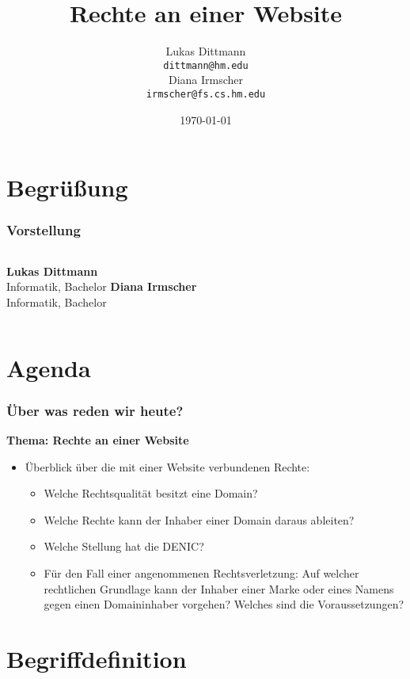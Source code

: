 \documentclass{beamer}
\title[Internet- und Medienrecht]{Rechte an einer Website}
\author[Lukas Dittmann \\und\\ Diana Irmscher]{Lukas Dittmann \\\texttt{dittmann@hm.edu}\\ Diana Irmscher\\\texttt{irmscher@fs.cs.hm.edu}}
\institute[Hochschule für angewandte Wissenschaften München]{Fakultät für Informatik und Mathematik}
\date{\today}
\begin{document}
	\maketitle
	
	\section{Begrüßung}
	
	\begin{frame}
		\frametitle{Vorstellung}
		\begin{columns}
			
			\textbf{Lukas Dittmann}
			\\
			Informatik, Bachelor
			\textbf{Diana Irmscher}
			\\
			Informatik, Bachelor
		\end{columns}
	\end{frame}
	
	\section{Agenda}
	
	\begin{frame}
		\frametitle{Über was reden wir heute?}
		\textbf{Thema: Rechte an einer Website}
		\\
		\begin{itemize}
			\item Überblick über die mit einer Website verbundenen Rechte:
			\begin{itemize}
				\item Welche Rechtsqualität besitzt eine Domain?
				\item Welche Rechte kann der Inhaber einer Domain daraus ableiten?
				\item Welche Stellung hat die DENIC?
				\item Für den Fall einer angenommenen Rechtsverletzung: Auf welcher rechtlichen Grundlage kann der Inhaber einer Marke oder eines Namens gegen einen Domaininhaber vorgehen? Welches sind die Voraussetzungen?
			\end{itemize}
		\end{itemize}
	\end{frame}
	
	\section{Begriffdefinition}
	
\end{document}
